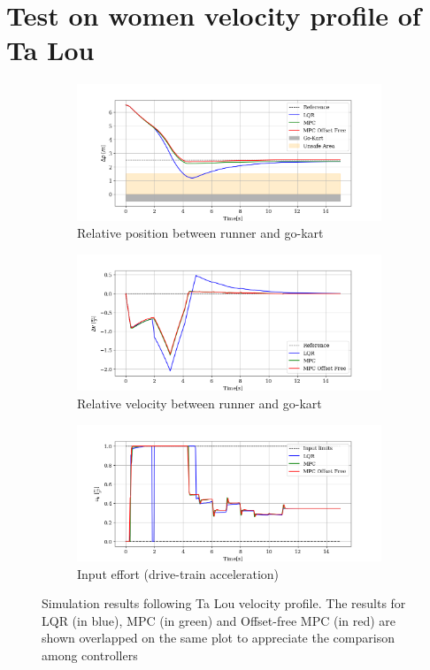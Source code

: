 \documentclass[a4paper,12pt,oneside]{book}
\begin{document}
\section{Test on women velocity profile of Ta Lou}
\begin{figure}[h!]
    \centering
    \begin{subfigure}[t]{0.8\textwidth}
        \includegraphics[width=\textwidth]{Ta_Lou/Deltap.png}
        \caption{Relative position between runner and go-kart}
        \label{fig:Deltapwomen}
    \end{subfigure}
    
    \begin{subfigure}[t]{0.8\textwidth}
        \includegraphics[width=\textwidth]{Ta_Lou/Deltav.png}
        \caption{Relative velocity between runner and go-kart}
        \label{fig:Deltavwomen}
    \end{subfigure}
    
    \begin{subfigure}[t]{0.8\textwidth}
        \includegraphics[width=\textwidth]{Ta_Lou/Input.png}
        \caption{Input effort (drive-train acceleration)}
        \label{fig:Inputwomen}
    \end{subfigure}
    \caption{Simulation results following Ta Lou velocity profile. The results for LQR (in blue), MPC (in green) and Offset-free MPC (in red) are shown overlapped on the same plot to appreciate the comparison among controllers}
    \label{fig:Women}
\end{figure}
\end{document}
